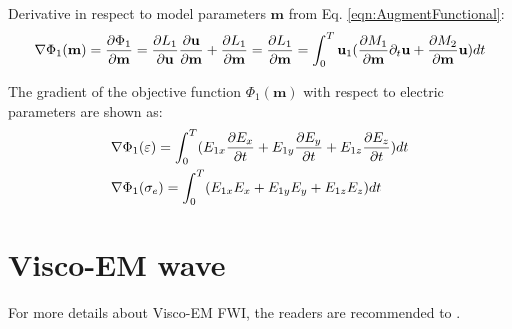 \documentclass[pdftex,a4paper,parskip,listof=totoc,bibliography=totoc,onehalfspacing,12pt]{scrreprt}
\begin{document}
\par Derivative in respect to model parameters $\mathbf{m}$ from Eq. \ref{eqn:AugmentFunctional}:
\begin{equation}
 \nabla \Phi_1(\mathbf{m})=\pdv{\Phi_1}{\mathbf{m}} = \pdv{L_1}{\mathbf{u}}\pdv{\mathbf{u}}{\mathbf{m}} + \pdv{L_1}{\mathbf{m}} =  \pdv{L_1}{\mathbf{m}} = \int_0^T \mathbf{u}_{1} (\pdv{M_{1}}{\mathbf{m}} \partial_{t}\mathbf{u} + \pdv{M_{2}}{\mathbf{m}} \mathbf{u} ) dt\\ 
\end{equation}
\par The gradient of the objective function $\Phi_1(\mathbf{m})$ with respect to electric parameters are shown as:
\begin{equation}
\label{eqn:GradientAdjoint1}
\begin{aligned}
& \nabla \Phi_1(\varepsilon) = \int_0^T ( E_{1x} \pdv{E_x}{t} + E_{1y} \pdv{E_y}{t} + E_{1z} \pdv{E_z}{t} ) dt\\
& \nabla \Phi_1(\sigma_e) = \int_0^T ( E_{1x} E_x + E_{1y} E_y + E_{1z} E_z  ) dt\\
\end{aligned}
\end{equation}

\chapter{Visco-EM wave}
\label{sec:Visco_EM_wave_equation}
For more details about Visco-EM FWI, the readers are recommended to \cite{qin2020full}.
\end{document}
